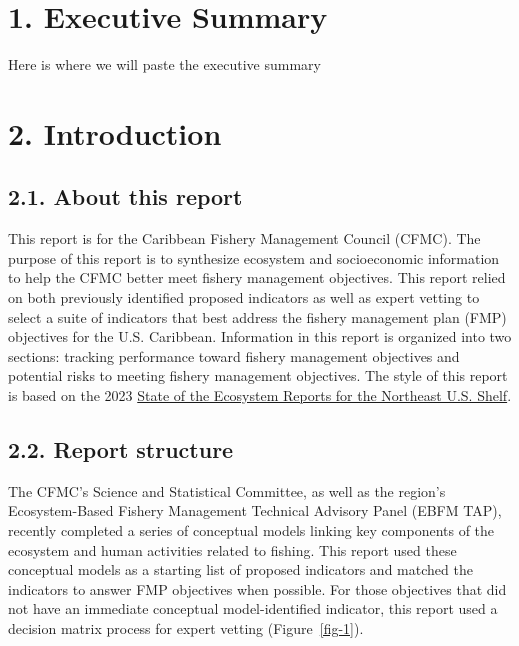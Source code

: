 \documentclass[
  letterpaper,
  oneside,
  open=any]{scrbook}
\renewcommand*\contentsname{Table of contents}
\newcommand\contentsname{Table of contents}
\begin{document}

\renewcommand*\contentsname{Table of contents}
{
\setcounter{tocdepth}{2}
\tableofcontents
}
\listoffigures
\listoftables
\mainmatter
{}

\chapter{1. Executive Summary}\label{executive-summary}

Here is where we will paste the executive summary


\chapter{2. Introduction}\label{introduction}

\section{2.1. About this report}\label{about-this-report}

This report is for the Caribbean Fishery Management Council (CFMC). The
purpose of this report is to synthesize ecosystem and socioeconomic
information to help the CFMC better meet fishery management objectives.
This report relied on both previously identified proposed indicators as
well as expert vetting to select a suite of indicators that best address
the fishery management plan (FMP) objectives for the U.S. Caribbean.
Information in this report is organized into two sections: tracking
performance toward fishery management objectives and potential risks to
meeting fishery management objectives. The style of this report is based
on the 2023
\href{https://www.fisheries.noaa.gov/new-england-mid-atlantic/ecosystems/state-ecosystem-reports-northeast-us-shelf}{State
of the Ecosystem Reports for the Northeast U.S. Shelf}.

\section{2.2. Report structure}\label{report-structure}

The CFMC's Science and Statistical Committee, as well as the region's
Ecosystem-Based Fishery Management Technical Advisory Panel (EBFM TAP),
recently completed a series of conceptual models linking key components
of the ecosystem and human activities related to fishing. This report
used these conceptual models as a starting list of proposed indicators
and matched the indicators to answer FMP objectives when possible. For
those objectives that did not have an immediate conceptual
model-identified indicator, this report used a decision matrix process
for expert vetting (Figure~\ref{fig-1}).
\end{document}
